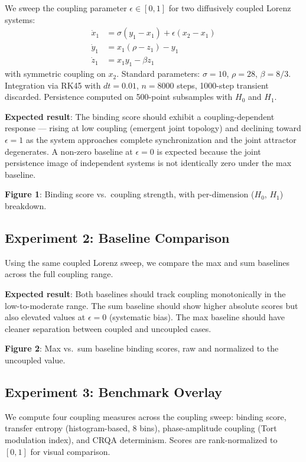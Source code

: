 \documentclass[11pt,a4paper]{article}
\begin{document}
We sweep the coupling parameter $\epsilon \in [0, 1]$ for two diffusively coupled Lorenz systems:
\begin{align}
    \dot{x}_1 &= \sigma(y_1 - x_1) + \epsilon(x_2 - x_1) \\
    \dot{y}_1 &= x_1(\rho - z_1) - y_1 \\
    \dot{z}_1 &= x_1 y_1 - \beta z_1
\end{align}
with symmetric coupling on $x_2$.
Standard parameters: $\sigma = 10$, $\rho = 28$, $\beta = 8/3$.
Integration via RK45 with $dt = 0.01$, $n = 8000$ steps, 1000-step transient discarded.
Persistence computed on 500-point subsamples with $H_0$ and $H_1$.

\textbf{Expected result}: The binding score should exhibit a coupling-dependent response --- rising at low coupling (emergent joint topology) and declining toward $\epsilon = 1$ as the system approaches complete synchronization and the joint attractor degenerates.
A non-zero baseline at $\epsilon = 0$ is expected because the joint persistence image of independent systems is not identically zero under the max baseline.

\textbf{Figure 1}: Binding score vs.\ coupling strength, with per-dimension ($H_0$, $H_1$) breakdown.

\subsection{Experiment 2: Baseline Comparison}\label{sec:exp-baseline}

Using the same coupled Lorenz sweep, we compare the max and sum baselines across the full coupling range.

\textbf{Expected result}: Both baselines should track coupling monotonically in the low-to-moderate range.
The sum baseline should show higher absolute scores but also elevated values at $\epsilon = 0$ (systematic bias).
The max baseline should have cleaner separation between coupled and uncoupled cases.

\textbf{Figure 2}: Max vs.\ sum baseline binding scores, raw and normalized to the uncoupled value.

\subsection{Experiment 3: Benchmark Overlay}\label{sec:exp-benchmarks}

We compute four coupling measures across the coupling sweep: binding score, transfer entropy (histogram-based, 8 bins), phase-amplitude coupling (Tort modulation index), and CRQA determinism.
Scores are rank-normalized to $[0, 1]$ for visual comparison.
\end{document}

